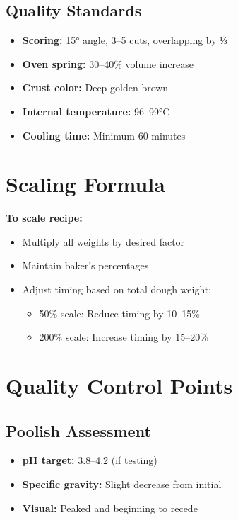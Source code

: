 \documentclass[10pt,a4paper]{article}
\begin{document}
    \subsection{Quality Standards}
    \begin{itemize}[leftmargin=*]
        \item \textbf{Scoring:} 15° angle, 3--5 cuts, overlapping by ⅓
        \item \textbf{Oven spring:} 30--40\% volume increase
        \item \textbf{Crust color:} Deep golden brown
        \item \textbf{Internal temperature:} 96--99°C
        \item \textbf{Cooling time:} Minimum 60 minutes
    \end{itemize}

    \section{Scaling Formula}

    \textbf{To scale recipe:}
    \begin{itemize}[leftmargin=*]
        \item Multiply all weights by desired factor
        \item Maintain baker's percentages
        \item Adjust timing based on total dough weight:
        \begin{itemize}
            \item 50\% scale: Reduce timing by 10--15\%
            \item 200\% scale: Increase timing by 15--20\%
        \end{itemize}
    \end{itemize}

    \section{Quality Control Points}

    \subsection{Poolish Assessment}
    \begin{itemize}[leftmargin=*]
        \item \textbf{pH target:} 3.8--4.2 (if testing)
        \item \textbf{Specific gravity:} Slight decrease from initial
        \item \textbf{Visual:} Peaked and beginning to recede
    \end{itemize}
\end{document}

